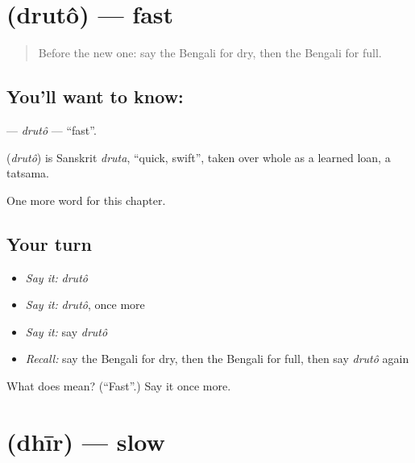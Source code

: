 \section[\texorpdfstring{\bn{দ্রুত} (drutô)}{দ্রুত (drutô)}]{ (drutô) — fast}

\label{lesson:BN-C135-druto}



\begin{quote}
Before the new one: say the Bengali for dry, then the Bengali for full.
\end{quote}

\subsection*{You'll want to know: }
\textbf{} — \emph{drutô} — \textquotedblleft{}fast\textquotedblright{}.

\begin{cousinweb}
\textbf{} (\emph{drutô}) is Sanskrit \emph{druta}, \textquotedblleft{}quick, swift\textquotedblright{}, taken over whole as a learned loan, a tatsama.
\end{cousinweb}

\begin{grammarlens}[title={What you've built}]
One more word for this chapter.
\end{grammarlens}

\subsection*{Your turn}
\begin{itemize}
\raggedright
  \item \emph{Say it:} \emph{drutô}
  \item \emph{Say it:} \emph{drutô}, once more
  \item \emph{Say it:} say \emph{drutô}
  \item \emph{Recall:} say the Bengali for dry, then the Bengali for full, then say \emph{drutô} again
\end{itemize}

\begin{tcolorbox}[breakable,colback=teal!4,colframe=teal!35!black,title={Before you move on}]
What does  mean? (\textquotedblleft{}Fast\textquotedblright{}.) Say it once more.
\end{tcolorbox}
\section[\texorpdfstring{\bn{ধীর} (dhīr)}{ধীর (dhīr)}]{ (dhīr) — slow}

